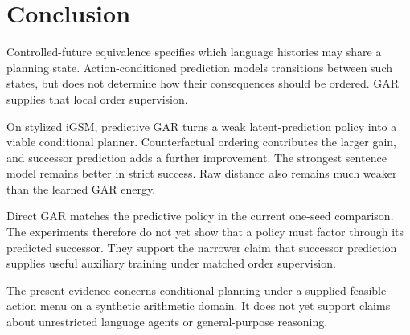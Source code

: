 \section{Conclusion}

Controlled-future equivalence specifies which language histories may share a planning state. Action-conditioned prediction models transitions between such states, but does not determine how their consequences should be ordered. GAR supplies that local order supervision.

On stylized iGSM, predictive GAR turns a weak latent-prediction policy into a viable conditional planner. Counterfactual ordering contributes the larger gain, and successor prediction adds a further improvement. The strongest sentence model remains better in strict success. Raw distance also remains much weaker than the learned GAR energy.

Direct GAR matches the predictive policy in the current one-seed comparison. The experiments therefore do not yet show that a policy must factor through its predicted successor. They support the narrower claim that successor prediction supplies useful auxiliary training under matched order supervision.

The present evidence concerns conditional planning under a supplied feasible-action menu on a synthetic arithmetic domain. It does not yet support claims about unrestricted language agents or general-purpose reasoning.

